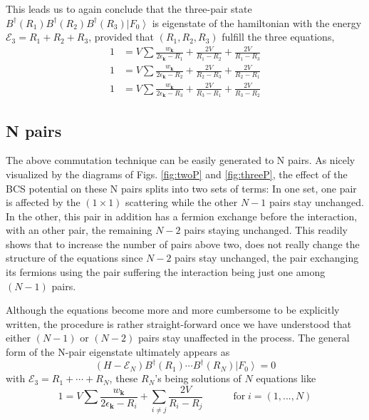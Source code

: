 \documentclass[aps,prb,amsmath,amssymb,superscriptaddress,twocolumn]{revtex4-1}
\newcommand{\vk}{\ensuremath{\mathbf{k}}}
\newcommand{\E}{\ensuremath{\mathbf{E}}}
\newcommand{\ket}[1]{\ensuremath{\left|#1\right>}}
\newcommand{\br}[1]{\ensuremath{\left(#1\right)}}
\newcommand{\fo}{\ensuremath{\ket{F_0}}}
\renewcommand{\E}{\ensuremath{\mathcal{E}}}
\begin{document}
This leads us to again conclude that the three-pair state $B^{\dagger}(R_1)B^{\dagger}(R_2)B^{\dagger}(R_3)\fo$ is eigenstate of the hamiltonian with the energy $\E_3=R_1+R_2+R_3$, provided that $\br{R_1,R_2, R_3}$ fulfill the three equations, 
\begin{equation}
\begin{split}
1&=V\sum\frac{w_{\vk}}{2\epsilon_{\vk}-R_1}+\frac{2V}{R_1-R_2}+\frac{2V}{R_1-R_3}\\
1&=V\sum\frac{w_{\vk}}{2\epsilon_{\vk}-R_2}+\frac{2V}{R_2-R_3}+\frac{2V}{R_2-R_1}\\
1&=V\sum\frac{w_{\vk}}{2\epsilon_{\vk}-R_3}+\frac{2V}{R_3-R_1}+\frac{2V}{R_3-R_2}
\end{split}
\end{equation}

\subsection{N pairs}
The above commutation technique can be easily generated to N pairs. As nicely visualized by the diagrams of Figs. \ref{fig:twoP} and \ref{fig:threeP}, the effect of the BCS potential on these N pairs splits into two sets of terms: In one set, one pair is affected by the $(1\times1)$ scattering while the other $N-1$ pairs stay unchanged. In the other, this pair in addition has a fermion exchange before the interaction, with an other pair, the remaining $N-2$ pairs staying unchanged. This readily shows that to increase the  number of pairs above two, does not really change the structure of the equations since $N-2$ pairs stay unchanged, the pair exchanging its fermions using the pair suffering the interaction  being just one among $(N-1)$ pairs. 

Although the equations become more and more cumbersome to be explicitly written, the procedure is rather straight-forward once we have understood that either $(N-1)$ or $(N-2)$ pairs stay unaffected in the process.  The general form of the N-pair eigenstate ultimately appears as 
\begin{equation}\label{eq:SchThreeN}
(H-\E_N)B^{\dagger}(R_1)\cdots{}B^{\dagger}(R_N)\fo=0
\end{equation}
with $\E_3=R_1+\cdots+R_N$, these $R_N$'s being  solutions of $N$ equations like
\begin{equation}
1=V\sum\frac{w_{\vk}}{2\epsilon_{\vk}-R_i}+\sum_{i\neq{j}}\frac{2V}{R_i-R_j}\quad\qquad \text{for}\; i=\br{1,...,N}
\end{equation}
\end{document}
